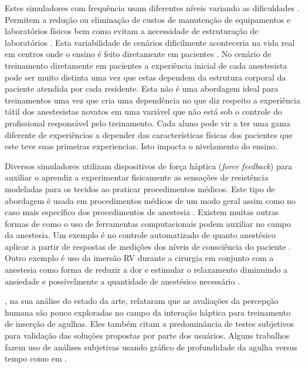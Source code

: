 Estes simuladores com frequência usam diferentes níveis variando as dificuldades \cite{Ullrich2012}. Permitem a redução ou eliminação de custos de manutenção de equipamentos e laboratórios físicos bem como evitam a necessidade de estruturação de laboratórios \cite{Silva2018}. 
Esta variabilidade de cenários dificilmente aconteceria na vida real em centros onde o ensino é feito diretamente em pacientes \cite{Udani2015}. No cenário de treinamento diretamente em pacientes a experiência inicial de cada anestesista pode ser muito distinta uma vez que estas dependem da estrutura corporal da paciente atendida por cada residente. Esta não é uma abordagem ideal para treinamentos uma vez que cria uma dependência no que diz respeito a experiência tátil dos anestesistas novatos em uma variável que não está sob o controle do profissional responsável pelo treinamento. Cada aluno pode vir a ter uma gama diferente de experiências a depender das características físicas dos pacientes que este teve suas primeiras experiencias. Isto impacta o nivelamento do ensino.

Diversos simuladores utilizam dispositivos de força háptica (\textit{force feedback}) para auxiliar o aprendiz a experimentar fisicamente as sensações de resistência modeladas para os tecidos ao praticar procedimentos médicos. Este tipo de abordagem é usada em procedimentos médicos de um modo geral \cite{Escobar-Castillejos2016, Patel2021} assim como no caso mais específico dos procedimentos de anestesia \cite{Vaughan2013, Collaco2021}. Existem muitas outras formas de como o uso de ferramentas computacionais podem auxiliar no campo da anestesia. Um exemplo é no controle automatizado de quanto anestésico aplicar a partir de respostas de medições dos níveis de consciência do paciente \cite{Mendez2009}. Outro exemplo é uso da imersão \acrshort{RV} durante a cirurgia em conjunto com a anestesia como forma de reduzir a dor e estimular o relaxamento diminuindo a ansiedade e possivelmente a quantidade de anestésico necessário \cite{Eijlers2019}.

\textcite{Correa2019}, na sua análise do estado da arte, relataram que as avaliações da percepção humana são pouco exploradas no campo da interação háptica para treinamento de inserção de agulhas. Eles também citam a predominância de testes subjetivos para validação das soluções propostas por parte dos usuários. Alguns trabalhos fazem uso de análises subjetivas usando gráfico de profundidade da agulha versus tempo como em \textcite{Magill2010}. 

